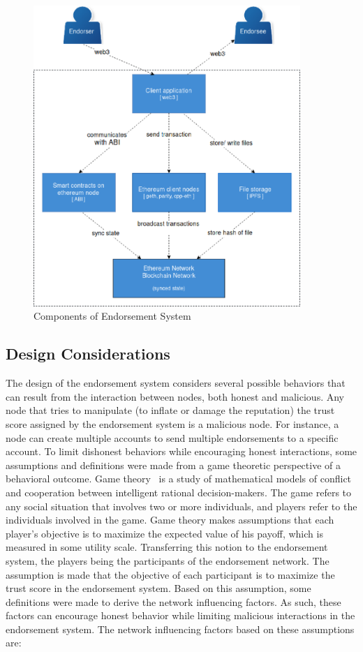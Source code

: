 \begin{figure}
	\includegraphics[width=0.9\textwidth]{Images/components.eps}
	\caption{Components of Endorsement System}
	\label{fig:components}
\end{figure}
\subsection{Design Considerations} \label{subsec:designconsiderations}
The design of the endorsement system considers several possible behaviors that
can result from the interaction between nodes, both honest and malicious. Any
node that tries to manipulate (to inflate or damage the reputation) the trust
score assigned by the endorsement system is a malicious node. For instance, a
node can create multiple accounts to send multiple endorsements to a specific
account. To limit dishonest behaviors while encouraging honest interactions,
some assumptions and definitions were made from a game theoretic perspective of
a behavioral outcome. Game theory~\cite{myerson2013game} is a study of
mathematical models of conflict and cooperation between intelligent rational
decision-makers. The game refers to any social situation that involves two or
more individuals, and players refer to the individuals involved in the game.
Game theory makes assumptions that each player's objective is to maximize the
expected value of his payoff, which is measured in some utility scale.
Transferring this notion to the endorsement system, the players being the
participants of the endorsement network. The assumption is made that the
objective of each participant is to maximize the trust score in the endorsement
system. Based on this assumption, some definitions were made to derive the
network influencing factors. As such, these factors can encourage honest
behavior while limiting malicious interactions in the endorsement system. 
The network influencing factors based on these assumptions are:
